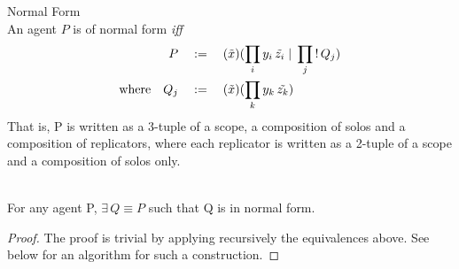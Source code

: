         \begin{definition}{Normal Form\\}
            An agent $P$ is of normal form \textit{iff}
            \begin{align*}
                                    P \quad &:= \quad (\tilde{x})(\prod_{i}{y_i \, \tilde{z_i}} \; | \; \prod_{j}{! \, Q_j}) \\
                \text{where} \quad Q_j \quad &:= \quad (\tilde{x})(\prod_{k}{y_k \, \tilde{z_k}})
            \end{align*}
            That is, P is written as a 3-tuple of a scope, a composition of solos and a composition of replicators, where each replicator is written as a 2-tuple of a scope and a composition of solos only.
        \end{definition}

        \begin{lemma}{~\\}
            For any agent P, $\exists \, Q \equiv P$ such that Q is in normal form.
            \begin{proof}
                The proof is trivial by applying recursively the equivalences above.
                See below for an algorithm for such a construction.
            \end{proof}
        \end{lemma}

